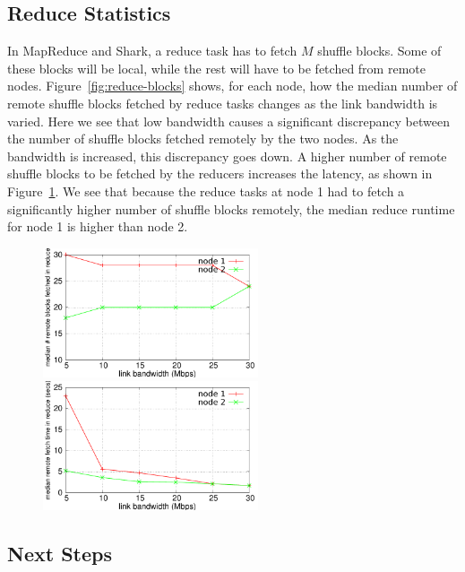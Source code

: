 \subsection{Reduce Statistics}

In MapReduce and Shark, a reduce task has to fetch $M$ shuffle blocks. Some of these blocks will be local, while the rest will have to be fetched from remote nodes.  Figure~\ref{fig:reduce-blocks} shows, for each node, how the median number of remote shuffle blocks fetched by reduce tasks changes as the link bandwidth is varied. Here we see that low bandwidth causes a significant discrepancy between the number of shuffle blocks fetched remotely by the two nodes. As the bandwidth is increased, this discrepancy goes down. A higher number of remote shuffle blocks to be fetched by the reducers increases the latency, as shown in Figure~\ref{fig:reduce-time}. We see that because the reduce tasks at node 1 had to fetch a significantly higher number of shuffle blocks remotely, the median reduce runtime for node 1 is higher than node 2.   

\begin{figure}[ht]
	\centering
	\begin{minipage}[b]{0.48\linewidth}
		\includegraphics[width=2.5in]{figs/reduce-blocks.pdf}
		\caption{}
		\label{fig:reduce-blocks}
	\end{minipage}
	\quad
	\begin{minipage}[b]{0.48\linewidth}
		\includegraphics[width=2.5in]{figs/reduce-time.pdf}
		\caption{}
		\label{fig:reduce-time}
	\end{minipage}
\end{figure}

\subsection{Next Steps}

